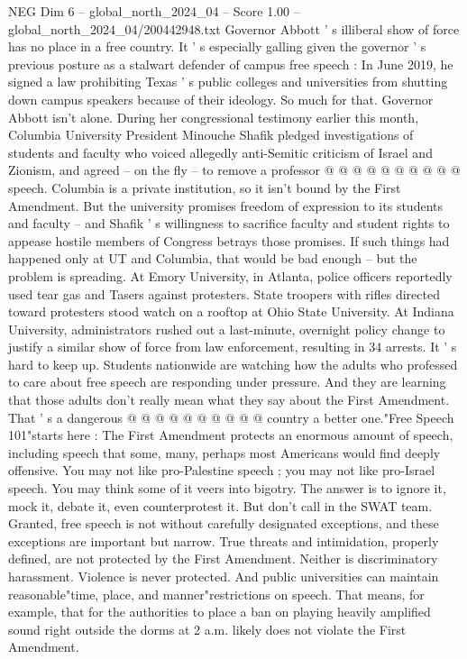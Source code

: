 \begin{textsample}{NEG Dim 6 – global\_north\_2024\_04 – Score 1.00 – global\_north\_2024\_04/200442948.txt}
Governor Abbott ' s illiberal show of force has no place in a free country.
It ' s especially galling given the governor ' s previous posture as a stalwart defender of campus free speech : In June 2019, he signed a law prohibiting Texas ' s public colleges and universities from shutting down campus speakers because of their ideology.
So much for that.
Governor Abbott isn't alone.
During her congressional testimony earlier this month, Columbia University President Minouche Shafik pledged investigations of students and faculty who voiced allegedly anti-Semitic criticism of Israel and Zionism, and agreed -- on the fly -- to remove a professor @ @ @ @ @ @ @ @ @ @ speech.
Columbia is a private institution, so it isn't bound by the First Amendment.
But the university promises freedom of expression to its students and faculty -- and Shafik ' s willingness to sacrifice faculty and student rights to appease hostile members of Congress betrays those promises.
If such things had happened only at UT and Columbia, that would be bad enough -- but the problem is spreading.
At Emory University, in Atlanta, police officers reportedly used tear gas and Tasers against protesters.
State troopers with rifles directed toward protesters stood watch on a rooftop at Ohio State University.
At Indiana University, administrators rushed out a last-minute, overnight policy change to justify a similar show of force from law enforcement, resulting in 34 arrests.
It ' s hard to keep up.
Students nationwide are watching how the adults who professed to care about free speech are responding under pressure.
And they are learning that those adults don't really mean what they say about the First Amendment.
That ' s a dangerous @ @ @ @ @ @ @ @ @ @ country a better one."Free Speech 101"starts here : The First Amendment protects an enormous amount of speech, including speech that some, many, perhaps most Americans would find deeply offensive.
You may not like pro-Palestine speech ; you may not like pro-Israel speech.
You may think some of it veers into bigotry.
The answer is to ignore it, mock it, debate it, even counterprotest it.
But don't call in the SWAT team.
Granted, free speech is not without carefully designated exceptions, and these exceptions are important but narrow.
True threats and intimidation, properly defined, are not protected by the First Amendment.
Neither is discriminatory harassment.
Violence is never protected.
And public universities can maintain reasonable"time, place, and manner"restrictions on speech.
That means, for example, that for the authorities to place a ban on playing heavily amplified sound right outside the dorms at 2 a.m. likely does not violate the First Amendment.

\end{textsample}
